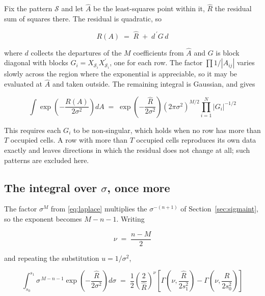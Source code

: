 Fix the pattern $\mathcal{S}$ and let $\hat{A}$ be the least-squares point within it,
$\hat{R}$ the residual sum of squares there. The residual is quadratic, so

\begin{equation}
R(A) \;=\; \hat{R} \;+\; d^{\,\prime} G \, d
\label{eq:quadratic}
\end{equation}

where $d$ collects the departures of the $M$ coefficients from $\hat{A}$ and $G$ is
block diagonal with blocks $G_{i} = X_{\mathcal{S}_{i}} X_{\mathcal{S}_{i}}^{\prime}$,
one for each row. The factor $\prod 1/|A_{ij}|$ varies slowly across the region where
the exponential is appreciable, so it may be evaluated at $\hat{A}$ and taken outside.
The remaining integral is Gaussian, and gives

\begin{equation}
\int \exp\!\left( -\frac{R(A)}{2\sigma^{2}} \right) dA
\;=\; \exp\!\left( -\frac{\hat{R}}{2\sigma^{2}} \right)
\left( 2\pi\sigma^{2} \right)^{M/2}
\prod_{i=1}^{N} \left| G_{i} \right|^{-1/2}
\label{eq:laplace}
\end{equation}

This requires each $G_{i}$ to be non-singular, which holds when no row has more than
$T$ occupied cells. A row with more than $T$ occupied cells reproduces its own data
exactly and leaves directions in which the residual does not change at all; such
patterns are excluded here.

\subsection{The integral over $\sigma$, once more}

The factor $\sigma^{M}$ from \eqref{eq:laplace} multiplies the $\sigma^{-(n+1)}$ of
Section~\ref{sec:sigmaint}, so the exponent becomes $M - n - 1$. Writing

\begin{equation}
\nu \;=\; \frac{n-M}{2}
\label{eq:nu}
\end{equation}

and repeating the substitution $u = 1/\sigma^{2}$,

\begin{equation}
\int_{s_{0}}^{s_{1}} \sigma^{\,M-n-1}
\exp\!\left( -\frac{\hat{R}}{2\sigma^{2}} \right) d\sigma
\;=\; \frac{1}{2} \left( \frac{2}{\hat{R}} \right)^{\nu}
\left[ \Gamma\!\left( \nu, \frac{\hat{R}}{2 s_{1}^{2}} \right)
     - \Gamma\!\left( \nu, \frac{\hat{R}}{2 s_{0}^{2}} \right) \right]
\label{eq:sigmaintM}
\end{equation}

